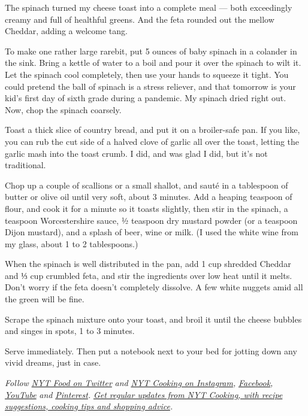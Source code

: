 The spinach turned my cheese toast into a complete meal --- both
exceedingly creamy and full of healthful greens. And the feta rounded
out the mellow Cheddar, adding a welcome tang.

To make one rather large rarebit, put 5 ounces of baby spinach in a
colander in the sink. Bring a kettle of water to a boil and pour it over
the spinach to wilt it. Let the spinach cool completely, then use your
hands to squeeze it tight. You could pretend the ball of spinach is a
stress reliever, and that tomorrow is your kid's first day of sixth
grade during a pandemic. My spinach dried right out. Now, chop the
spinach coarsely.

Toast a thick slice of country bread, and put it on a broiler-safe pan.
If you like, you can rub the cut side of a halved clove of garlic all
over the toast, letting the garlic mash into the toast crumb. I did, and
was glad I did, but it's not traditional.

Chop up a couple of scallions or a small shallot, and sauté in a
tablespoon of butter or olive oil until very soft, about 3 minutes. Add
a heaping teaspoon of flour, and cook it for a minute so it toasts
slightly, then stir in the spinach, a teaspoon Worcestershire sauce, ½
teaspoon dry mustard powder (or a teaspoon Dijon mustard), and a splash
of beer, wine or milk. (I used the white wine from my glass, about 1 to
2 tablespoons.)

When the spinach is well distributed in the pan, add 1 cup shredded
Cheddar and ⅓ cup crumbled feta, and stir the ingredients over low heat
until it melts. Don't worry if the feta doesn't completely dissolve. A
few white nuggets amid all the green will be fine.

Scrape the spinach mixture onto your toast, and broil it until the
cheese bubbles and singes in spots, 1 to 3 minutes.

Serve immediately. Then put a notebook next to your bed for jotting down
any vivid dreams, just in case.

\emph{Follow} \href{https://twitter.com/nytfood}{\emph{NYT Food on
Twitter}} \emph{and}
\href{https://www.instagram.com/nytcooking/}{\emph{NYT Cooking on
Instagram}}\emph{,}
\href{https://www.facebookcorewwwi.onion/nytcooking/}{\emph{Facebook}}\emph{,}
\href{https://www.youtube.com/nytcooking}{\emph{YouTube}} \emph{and}
\href{https://www.pinterest.com/nytcooking/}{\emph{Pinterest}}\emph{.}
\href{https://www.nytimes3xbfgragh.onion/newsletters/cooking}{\emph{Get
regular updates from NYT Cooking, with recipe suggestions, cooking tips
and shopping advice}}\emph{.}

